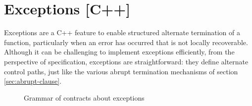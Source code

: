 \section{Exceptions [C++]}
\label{sec:exceptions}

Exceptions are a C++ feature to enable structured alternate termination of a function, particularly when an error has occurred that is not locally recoverable. Although it can be challenging to implement exceptions efficiently, from the perspective of specification, exceptions are straightforward: they define alternate control paths, just like the various abrupt termination mechanisms of section \ref{sec:abrupt-clause}.

\begin{figure}[t]
	\begin{cadre}
		
	\end{cadre}
	\caption{Grammar of contracts about exceptions}
	\label{fig:gram:throws-clause}
\end{figure}


